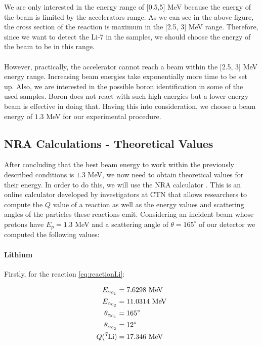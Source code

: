 \documentclass{article}
\begin{document}
\begin{multicols}{2}
We are only interested in the energy range of [0.5,5] MeV because the energy of the beam is limited by the accelerators range. As we can see in the above figure, the cross section of the reaction is maximum in the [2.5, 3] MeV range. Therefore, since we want to detect the Li-7 in the samples, we should choose the energy of the beam to be in this range. 
\paragraph{}
However, practically, the accelerator cannot reach a beam within the [2.5, 3] MeV energy range. Increasing beam energies take exponentially more time to be set up. Also, we are interested in the possible boron identification in some of the used samples. Boron does not react with such high energies but a lower energy beam is effective in doing that.
Having this into consideration, we choose a beam energy of $1.3$ MeV for our experimental procedure.

\subsection{NRA Calculations - Theoretical Values}
    \label{sec:theoreticalvalues}

After concluding that the best beam energy to work within the previously described conditions is $1.3$ MeV, we now need to obtain theoretical values for their energy. In order to do this, we will use the NRA calculator \cite{NRAEnergyCalc}. This is an online calculator developed by investigators at CTN that allows researchers to compute the $Q$ value of a reaction as well as the energy values and scattering angles of the particles these reactions emit. Considering an incident beam whose protons have $E_p = 1.3$ MeV and a scattering angle of $\theta = 165 ^{\circ}$ of our detector we computed the following values:

\paragraph{Lithium} Firstly, for the reaction \ref{eq:reactionLi}:

\begin{equation}
\begin{split}
  E_{\alpha_{0_1}} &= 7.6298 \text{ MeV} \\
  E_{\alpha_{0_2}} &= 11.0314 \text{ MeV} \\
  \theta_{\alpha_{0_1}} &= 165 ^{\circ} \\
  \theta_{\alpha_{0_2}} &= 12 ^{\circ} \\
  Q (\ce{^7Li}) &= 17.346 \text{ MeV} \\
\end{split}
\label{eq:energiesli}
\end{equation}


\end{multicols}
\end{document}
